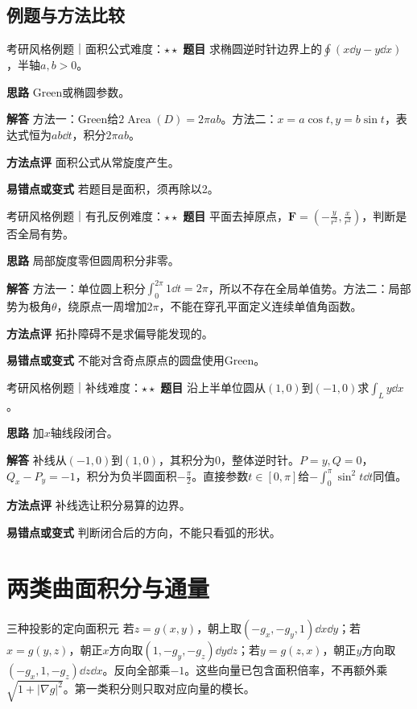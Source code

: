 \subsection{例题与方法比较}
\begin{example}{考研风格例题｜面积公式}{难度：$\star\star$}
\label{ex:8:4}\textbf{题目} 求椭圆逆时针边界上的$\oint(x\dd y-y\dd x)$，半轴$a,b>0$。\par
\textbf{思路} Green或椭圆参数。\par
\textbf{解答} 方法一：Green给$2\operatorname{Area}(D)=2\pi ab$。方法二：$x=a\cos t,y=b\sin t$，表达式恒为$ab\dd t$，积分$2\pi ab$。\par
\textbf{方法点评} 面积公式从常旋度产生。\par
\textbf{易错点或变式} 若题目是面积，须再除以2。
\end{example}
\begin{example}{考研风格例题｜有孔反例}{难度：$\star\star$}
\label{ex:8:5}\textbf{题目} 平面去掉原点，$\bm F=(-\frac{y}{r^2},\frac{x}{r^2})$，判断是否全局有势。\par
\textbf{思路} 局部旋度零但圆周积分非零。\par
\textbf{解答} 方法一：单位圆上积分$\int_0^{2\pi}1\dd t=2\pi$，所以不存在全局单值势。方法二：局部势为极角$\theta$，绕原点一周增加$2\pi$，不能在穿孔平面定义连续单值角函数。\par
\textbf{方法点评} 拓扑障碍不是求偏导能发现的。\par
\textbf{易错点或变式} 不能对含奇点原点的圆盘使用Green。
\end{example}
\begin{example}{考研风格例题｜补线}{难度：$\star\star$}
\label{ex:8:6}\textbf{题目} 沿上半单位圆从$(1,0)$到$(-1,0)$求$\int_L y\dd x$。\par
\textbf{思路} 加$x$轴线段闭合。\par
\textbf{解答} 补线从$(-1,0)$到$(1,0)$，其积分为0，整体逆时针。$P=y,Q=0$，$Q_x-P_y=-1$，积分为负半圆面积$-\frac{\pi}{2}$。直接参数$t\in[0,\pi]$给$-\int_0^\pi\sin^2t\dd t$同值。\par
\textbf{方法点评} 补线选让积分易算的边界。\par
\textbf{易错点或变式} 判断闭合后的方向，不能只看弧的形状。
\end{example}
\section{两类曲面积分与通量}\label{sec:8:3}

\begin{method}{三种投影的定向面积元}
若$z=g(x,y)$，朝上取$(-g_x,-g_y,1)\dd x\dd y$；若$x=g(y,z)$，朝正$x$方向取$(1,-g_y,-g_z)\dd y\dd z$；若$y=g(z,x)$，朝正$y$方向取$(-g_x,1,-g_z)\dd z\dd x$。反向全部乘$-1$。这些向量已包含面积倍率，不再额外乘$\sqrt{1+|\nabla g|^2}$。第一类积分则只取对应向量的模长。
\end{method}

